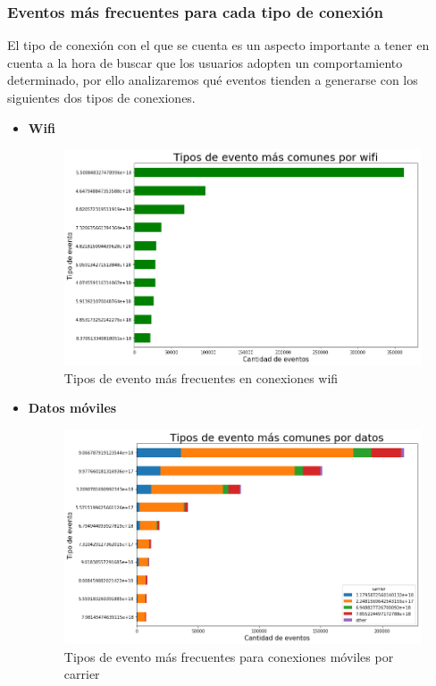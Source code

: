 \documentclass[a4paper, 12pt]{article}
\begin{document}
		\subsubsection*{Eventos más frecuentes para cada tipo de conexión}
			El tipo de conexión con el que se cuenta es un aspecto importante a tener en cuenta a la hora de buscar que los usuarios adopten un comportamiento determinado, por ello analizaremos qué eventos tienden a generarse con los siguientes dos tipos de conexiones.
			\begin{itemize}
				\item \textbf{Wifi}
				\FloatBarrier
				\begin{figure}[h]
					\centering
					\includegraphics[width=\textwidth]{images/events/eventsxwifi.png}
					\caption{Tipos de evento más frecuentes en conexiones wifi}
				\end{figure}
				\FloatBarrier
				\item \textbf{Datos móviles}
				\FloatBarrier
				\begin{figure}[h]
					\centering
					\includegraphics[width=\textwidth]{images/events/eventosxdatosycarrier.png}
					\caption{Tipos de evento más frecuentes para conexiones móviles por carrier}
				\end{figure}
				\FloatBarrier
			\end{itemize}
\end{document}
